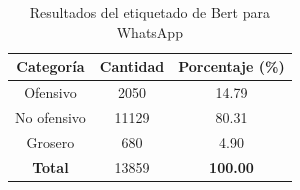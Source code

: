 \begin{table}[!ht]
	\centering
	\begin{tabular}{|c|c|c|}
		\hline
		\textbf{Categoría} & \textbf{Cantidad} & \textbf{Porcentaje (\%)} \\ \hline
		Ofensivo & 2050 & 14.79 \\ 
		No ofensivo & 11129 & 80.31 \\ 
		Grosero & 680 & 4.90 \\ \hline
		\textbf{Total} & 13859 & \textbf{100.00} \\ \hline
	\end{tabular}
	\caption{Resultados del etiquetado de Bert para WhatsApp}
	\label{tbl:whatsapp}
\end{table}


